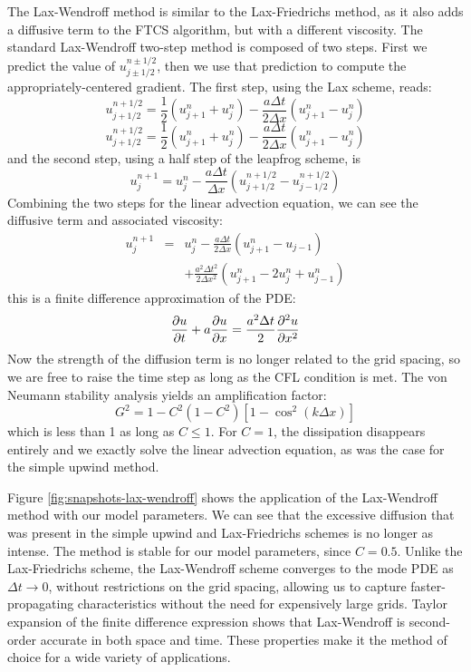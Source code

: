 \documentclass[%
 reprint,
 amsmath,amssymb,
 aps,
]{revtex4-2}
\begin{document}
The Lax-Wendroff method is similar to the Lax-Friedrichs method, as it also adds a diffusive term to the FTCS algorithm, but with a different viscosity. The standard Lax-Wendroff two-step method is composed of two steps. First we predict the value of $u^{n \pm 1/2} _{j \pm 1/2}$, then we use that prediction to compute the appropriately-centered gradient. The first step, using the Lax scheme, reads:
\begin{equation*}
u_{j + 1/2} ^{n + 1/2} = \frac{1}{2} \left( u_{j + 1} ^n + u_j ^n \right) - \frac{a \Delta t}{2 \Delta x} \left( u_{j+1} ^n - u_j ^n \right)
\end{equation*}
\begin{equation*}
u_{j + 1/2} ^{n + 1/2} = \frac{1}{2} \left( u_{j + 1} ^n + u_j ^n \right) - \frac{a \Delta t}{2 \Delta x} \left( u_{j+1} ^n - u_j ^n \right)
\end{equation*}
and the second step, using a half step of the leapfrog scheme, is
\begin{equation}
u_j ^{n+1} = u_j ^n - \frac{a \Delta t}{\Delta x} \left( u_{j + 1/2} ^{n + 1/2} - u_{j - 1/2} ^{n + 1/2} \right)
\end{equation}
Combining the two steps for the linear advection equation, we can see the diffusive term and associated viscosity:
\begin{eqnarray*}
u_j ^{n+1} & = & u_j ^n - \frac{a \Delta t}{2 \Delta x} \left( u_{j+1} ^n - u_{j-1} \right) \\
& & + \frac{ a^2 \Delta t ^2}{2 \Delta x ^2} \left( u_{j + 1} ^n - 2 u_j ^n + u_{j - 1} ^n \right)
\end{eqnarray*}
this is a finite difference approximation of the PDE:
\begin{equation}
\pdv{u}{t} + a \pdv{u}{x} = \frac{a^2 \Delta t}{2} \pdv{^2 u }{x^2}
\end{equation}
Now the strength of the diffusion term is no longer related to the grid spacing, so we are free to raise the time step as long as the CFL condition is met. The von Neumann stability analysis yields an amplification factor:
\begin{equation}
G ^2 = 1 - C^2 (1 - C^2) \left[1 - \cos ^2 (k \Delta x) \right]
\end{equation}
which is less than 1 as long as $C \leq 1$. For $C = 1$, the dissipation disappears entirely and we exactly solve the linear advection equation, as was the case for the simple upwind method.

Figure \ref{fig:snapshots-lax-wendroff} shows the application of the Lax-Wendroff method with our model parameters. We can see that the excessive diffusion that was present in the simple upwind and Lax-Friedrichs schemes is no longer as intense. The method is stable for our model parameters, since $C = 0.5$. Unlike the Lax-Friedrichs scheme, the Lax-Wendroff scheme converges to the mode PDE as $\Delta t \rightarrow 0$, without restrictions on the grid spacing, allowing us to capture faster-propagating characteristics without the need for expensively large grids. Taylor expansion of the finite difference expression shows that Lax-Wendroff is second-order accurate in both space and time. These properties make it the method of choice for a wide variety of applications.
\end{document}

